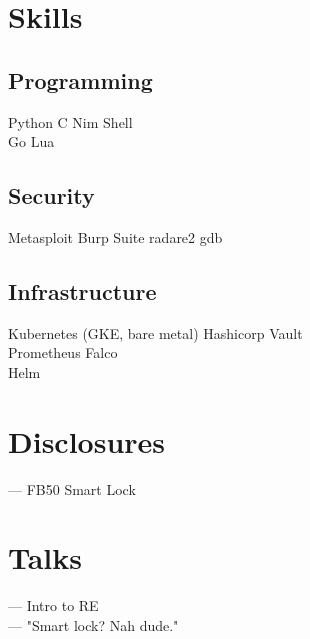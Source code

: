 \documentclass[]{config}
\begin{document}
\begin{minipage}[t]{0.33\textwidth}
\section{Skills}
\subsection{Programming}
Python \textbullet{} C \textbullet{} Nim \textbullet{} Shell \\
\textbullet{} Go \textbullet{} Lua
\sectionsep
\subsection{Security}
Metasploit \textbullet{} Burp Suite \textbullet{}
radare2 \textbullet{} gdb
\sectionsep
\subsection{Infrastructure}
Kubernetes (GKE, bare metal) \textbullet{} Hashicorp Vault \\
\textbullet{} Prometheus  \textbullet{} Falco \\
\textbullet{} Helm
\sectionsep


\section{Disclosures}
{\bf{}} — FB50 Smart Lock

\vspace{4mm} %
\section{Talks}
{\bf{}} — Intro to RE \\
{\bf{}} — "Smart lock? Nah dude."
%
%

\end{minipage} 
\hfill
\end{document}
